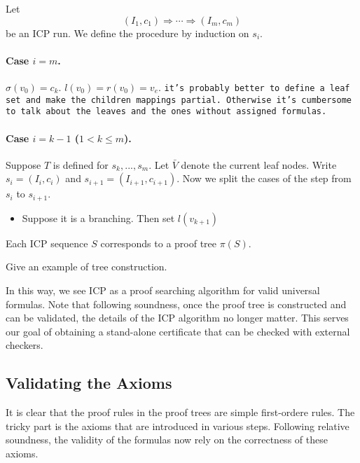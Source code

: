 \documentclass[envcountsect]{llncs}
\begin{document}
\begin{definition}
Let $$(I_1, c_1)\Longrightarrow \cdots \Longrightarrow (I_m, c_m)$$ be an ICP run. 
We define the procedure by induction on $s_i$.
\paragraph{Case $i= m$.} $\sigma(v_0) = c_k$. $l(v_0) = r(v_0) = v_e$. {\tt it's
probably better to define a leaf set and make the children mappings partial.
Otherwise it's cumbersome to talk about the leaves and the ones without
assigned formulas. } 
\paragraph{Case $i = k-1$ ($1< k \leq m$). }
Suppose $T$ is defined for $s_k,...,s_m$. Let $\bar V$ denote the current leaf
nodes. Write $s_i = (I_i, c_i)$ and $s_{i+1} = (I_{i+1}, c_{i+1})$. Now we split
the cases of the step from $s_i$ to $s_{i+1}$. 
\begin{itemize}
\item Suppose it is a branching. Then set $l(v_{k+1})$
\end{itemize}


\end{definition}

\begin{theorem}[ST-Correspondence]
Each ICP sequence $S$ corresponds to a proof tree $\pi(S)$.
\end{theorem}


\begin{example}
Give an example of tree construction. 
\end{example}


In this way, we see ICP as a proof searching algorithm for valid universal
formulas. Note that following soundness, once the proof tree is constructed and
can be validated, the details of the ICP algorithm no longer matter. This serves
our goal of obtaining a stand-alone certificate that can be checked with
external checkers. 

\subsection{Validating the Axioms}


It is clear that the proof rules in the proof trees are simple first-ordere
rules. The tricky part is the axioms that are introduced in various
steps. Following relative soundness, the validity of the formulas now rely on the
correctness of these axioms. 
\end{document}
